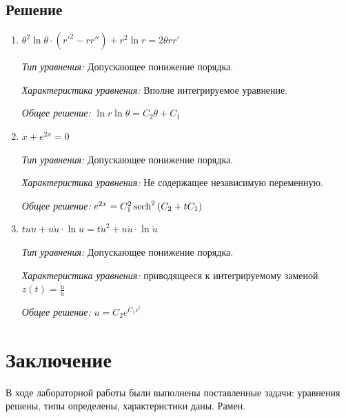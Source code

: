 \documentclass[14pt, titlepage, a4paper, fleqn]{extarticle}
\begin{document}
        \subsection{Решение}
            \begin{enumerate}
                \item \(
                    \theta^2 \ln{\theta} \cdot (r'^2 - rr'') + r^2 \ln{r} = 2\theta rr'  
                \)

                    \textit{Тип уравнения:}
                        Допускающее понижение порядка.

                    \textit{Характеристика уравнения:}
                        Вполне интегрируемое уравнение.

                    \textit{Общее решение:}
                        \(\displaystyle
                            \ln{r}\ln{\theta} = C_2\theta + C_1
                        \)

                \item \(\ddot{x} + e^{2x} = 0\)
                
                    \textit{Тип уравнения:}
                        Допускающее понижение порядка.

                    \textit{Характеристика уравнения:}
                        Не содержащее независимую переменную.

                    \textit{Общее решение:}
                        \(e^{2x} = C_1^2\operatorname{sech}^2{\left(C_2 + tC_1\right)}\)

                \item \(tu\ddot{u} + u\dot{u} \cdot \ln{u} = t\dot{u}^2 + u\dot{u} \cdot \ln{\dot{u}}\)
                
                \textit{Тип уравнения:}
                    Допускающее понижение порядка.

                \textit{Характеристика уравнения:}
                    приводящееся к интегрируемому заменой \(\displaystyle z(t) = \frac{\dot{u}}{u}\)
                
                \textit{Общее решение:}
                    \(u = C_2e^{C_1e^t}\)
            \end{enumerate}
            
            \pagebreak

    \section{Заключение}
        В ходе лабораторной работы были выполнены поставленные задачи: уравнения решены, типы определены, характеристики даны. Рамен.
\end{document}
